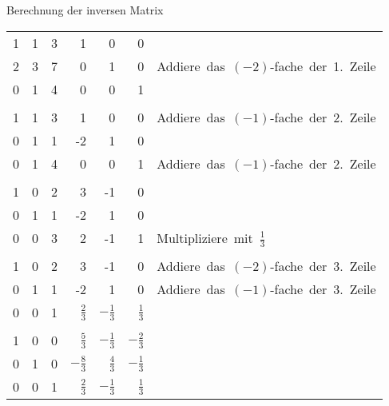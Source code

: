 \documentclass[german]{beamer}
\begin{document}
\begin{frame}{Berechnung der inversen Matrix}

{\footnotesize
\begin{center}
\begin{tabular}{rrr|rrrl}
 1 &  1 &  3 & 1 & 0 & 0 & \\
 2 &  3 &  7 & 0 & 1 & 0 & \mbox{Addiere das $(-2)$-fache der 1. Zeile} \\
 0 &  1 &  4 & 0 & 0 & 1 & \\
 & & & & \\
 1 &  1 &  3 & 1 & 0 & 0 & \mbox{Addiere das $(-1)$-fache der 2. Zeile} \\
 0 &  1 &  1 & -2 & 1 & 0 & \\
 0 &  1 &  4 & 0 & 0 & 1 & \mbox{Addiere das $(-1)$-fache der 2. Zeile} \\
 & & & & \\
 1 &  0 &  2 & 3 & -1 & 0 & \\
 0 &  1 &  1 & -2 & 1 & 0 & \\
 0 &  0 &  3 & 2 & -1 & 1 & \mbox{Multipliziere mit $\frac{1}{3}$} \\
 & & & & \\
 1 &  0 &  2 & 3 & -1 & 0 & \mbox{Addiere das $(-2)$-fache der 3. Zeile} \\
 0 &  1 &  1 & -2 & 1 & 0 & \mbox{Addiere das $(-1)$-fache der 3. Zeile} \\
 0 &  0 &  1 & $\frac{2}{3}$ & $-\frac{1}{3}$ & $\frac{1}{3}$ & \\
 & & & & \\
 1 &  0 &  0 & $\frac{5}{3}$ & $-\frac{1}{3}$ & $-\frac{2}{3}$ & \\
 0 &  1 &  0 & $-\frac{8}{3}$ & $\frac{4}{3}$ & $-\frac{1}{3}$ & \\
 0 &  0 &  1 & $\frac{2}{3}$ & $-\frac{1}{3}$ & $\frac{1}{3}$ & \\
\end{tabular}
\end{center}
}

\end{frame}
\end{document}
